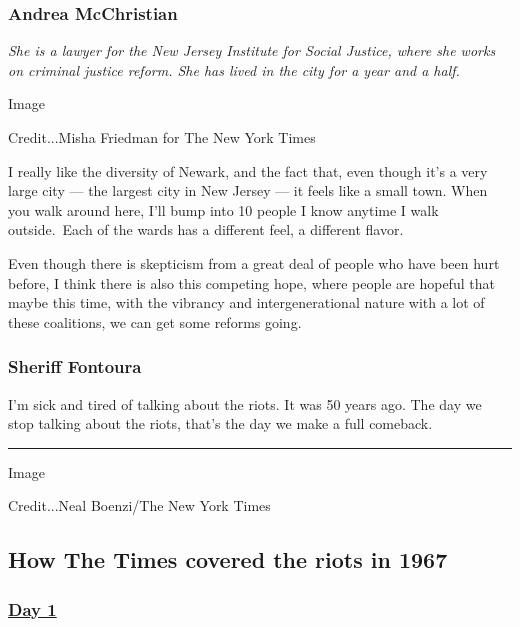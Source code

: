 \hypertarget{andrea-mcchristian}{%
\subsubsection{Andrea McChristian}\label{andrea-mcchristian}}

\emph{She is a lawyer for the New Jersey Institute for Social Justice,
where she works on criminal justice reform. She has lived in the city
for a year and a half.}

Image

Credit...Misha Friedman for The New York Times

I really like the diversity of Newark, and the fact that, even though
it's a very large city --- the largest city in New Jersey --- it feels
like a small town. When you walk around here, I'll bump into 10 people I
know anytime I walk outside.~Each of the wards has a different feel, a
different flavor.

Even though there is skepticism from a great deal of people who have
been hurt before, I think there is also this competing hope, where
people are hopeful that maybe this time, with the vibrancy and
intergenerational nature with a lot of these coalitions, we can get some
reforms going. ​

\hypertarget{sheriff-fontoura-1}{%
\subsubsection{Sheriff Fontoura}\label{sheriff-fontoura-1}}

I'm sick and tired of talking about the riots. It was 50 years ago. The
day we stop talking about the riots, that's the day we make a full
comeback.~

\begin{center}\rule{0.5\linewidth}{\linethickness}\end{center}

Image

Credit...Neal Boenzi/The New York Times

\hypertarget{how-the-times-covered-the-riots-in-1967}{%
\subsection{How The Times covered the riots in
1967}\label{how-the-times-covered-the-riots-in-1967}}

\hypertarget{day-1}{%
\subsubsection{\texorpdfstring{\href{https://timesmachine.nytimes3xbfgragh.onion/timesmachine/1967/07/13/90372463.html?pageNumber=1}{Day
1}}{Day 1}}\label{day-1}}

